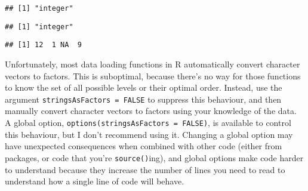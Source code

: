 \begin{Shaded}
\begin{Highlighting}[]
\StringTok{ }\NormalTok{(} \NormalTok{, }\NormalTok{)}
\OperatorTok{$}
\end{Highlighting}
\end{Shaded}

\begin{verbatim}
## [1] "integer"
\end{verbatim}

\begin{Shaded}
\begin{Highlighting}[]
\OperatorTok{$}
\end{Highlighting}
\end{Shaded}

\begin{verbatim}
## [1] "integer"
\end{verbatim}

\begin{Shaded}
\begin{Highlighting}[]
\OperatorTok{$}
\end{Highlighting}
\end{Shaded}

\begin{verbatim}
## [1] 12  1 NA  9
\end{verbatim}

\begin{Shaded}
\begin{Highlighting}[]
\end{Highlighting}
\end{Shaded}

Unfortunately, most data loading functions in R automatically convert
character vectors to factors. This is suboptimal, because there's no way
for those functions to know the set of all possible levels or their
optimal order. Instead, use the argument
\texttt{stringsAsFactors\ =\ FALSE} to suppress this behaviour, and then
manually convert character vectors to factors using your knowledge of
the data. A global option, \texttt{options(stringsAsFactors\ =\ FALSE)},
is available to control this behaviour, but I don't recommend using it.
Changing a global option may have unexpected consequences when combined
with other code (either from packages, or code that you're
\texttt{source()}ing), and global options make code harder to understand
because they increase the number of lines you need to read to understand
how a single line of code will behave. 

